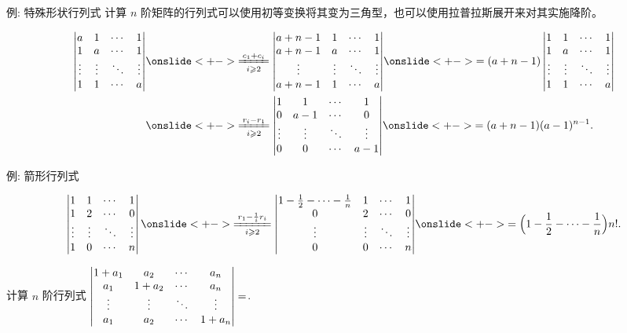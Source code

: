 \begin{frame}{例: 特殊形状行列式}
	\onslide<+->
	计算 $n$ 阶矩阵的行列式可以使用初等变换将其变为三角型，也可以使用拉普拉斯展开来对其实施降阶。
	\onslide<+->
	\begin{example}
		\begin{align*}
			\detm{
			a&1&\cdots&1\\
			1&a&\cdots&1\\
			\vdots&\vdots&\ddots&\vdots\\
			1&1&\cdots&a
		}
		&\onslide<+->{\xeq[i\ge2]{c_1+c_i}\detm{
			a+n-1&1&\cdots&1\\
			a+n-1&a&\cdots&1\\
			\vdots&\vdots&\ddots&\vdots\\
			a+n-1&1&\cdots&a
		}}
		\onslide<+->{=(a+n-1)\detm{
			1&1&\cdots&1\\
			1&a&\cdots&1\\
			\vdots&\vdots&\ddots&\vdots\\
			1&1&\cdots&a
		}}\\
		&\onslide<+->{\xeq[i\ge2]{r_i-r_1}\detm{
			1&1&\cdots&1\\
			0&a-1&\cdots&0\\
			\vdots&\vdots&\ddots&\vdots\\
			0&0&\cdots&a-1
		}}
		\onslide<+->{=(a+n-1)(a-1)^{n-1}.}
		\end{align*}
	\end{example}
\end{frame}


\begin{frame}{例: 箭形行列式}
	\onslide<+->
	\begin{example}
		\[\detm{
			1&1&\cdots&1\\
			1&2&\cdots&0\\
			\vdots&\vdots&\ddots&\vdots\\
			1&0&\cdots&n
		}\onslide<+->{\xeq[i\ge 2]{r_1-\frac1i r_i}
		\detm{
			1-\frac12-\cdots-\frac1n&1&\cdots&1\\
			0&2&\cdots&0\\
			\vdots&\vdots&\ddots&\vdots\\
			0&0&\cdots&n
		}}
		\onslide<+->{=\Bigl(1-\frac12-\cdots-\frac1n\Bigr)n!.}\]
	\end{example}
	\onslide<+->
	\begin{exercise}
		计算 $n$ 阶行列式 $\left|\begin{matrix}
			1+a_1&a_2&\cdots&a_n\\
			a_1&1+a_2&\cdots&a_n\\
			\vdots&\vdots&\ddots&\vdots\\
			a_1&a_2&\cdots&1+a_n
		\end{matrix}\right|=$.
	\end{exercise}
\end{frame}


